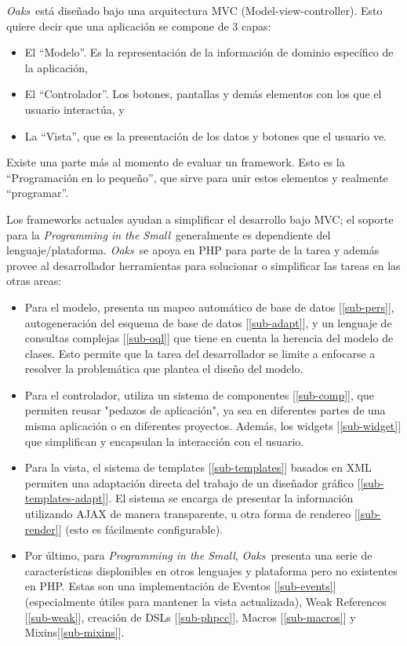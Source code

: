 \documentclass[a4paper,10pt]{article}
\newcommand{\PITS}{\emph{Programming in the Small}} %
\newcommand{\PWB}{\emph{Oaks}}
\begin{document}
\PWB \ está diseñado bajo una arquitectura MVC (Model-view-controller).
Esto quiere decir que una aplicación se compone de 3 capas:
\begin{itemize}
\item El ``Modelo''. Es la representación de la información de dominio específico de la aplicación,
\item El ``Controlador''. Los botones, pantallas y demás elementos con los que el usuario interactúa, y
\item La ``Vista'', que es la presentación de los datos y botones que el usuario ve.
\end{itemize}

Existe una parte más al momento de evaluar un framework. Esto es la ``Programación en lo pequeño'', que sirve para unir estos elementos y realmente ``programar''.

Los frameworks actuales ayudan a simplificar el desarrollo bajo MVC; el soporte para la \PITS \ generalmente es dependiente del lenguaje/plataforma. \PWB \ se apoya en PHP para parte de la tarea y además provee al desarrollador herramientas para solucionar o simplificar las tareas en las otras areas:

\begin{itemize}
\item Para el modelo, presenta un mapeo automático de base de datos [\ref{sub-pers}], autogeneración del esquema de base de datos [\ref{sub-adapt}], y un lenguaje de consultas complejas [\ref{sub-oql}] que tiene en cuenta la herencia del modelo de clases.  Esto permite que la tarea del desarrollador se limite a enfocarse a resolver la problemática que plantea el diseño del modelo.

\item Para el controlador, utiliza un sistema de componentes [\ref{sub-comp}], que permiten reusar "pedazos de aplicación", ya sea en diferentes partes de una misma aplicación o en diferentes proyectos. Además, los widgets [\ref{sub-widget}] que simplifican y encapsulan la interacción con el usuario.

\item Para la vista, el sistema de templates [\ref{sub-templates}] basados en XML permiten una adaptación directa del trabajo de un diseñador gráfico [\ref{sub-templates-adapt}]. El sistema se encarga de presentar la información utilizando AJAX de manera transparente, u otra forma de rendereo [\ref{sub-render}] (esto es fácilmente configurable).

\item Por último, para \PITS, \PWB \ presenta una serie de características displonibles en otros lenguajes y plataforma pero no existentes en PHP. Estas son una implementación de Eventos [\ref{sub-events}] (especialmente útiles para mantener la vista actualizada), Weak References [\ref{sub-weak}], creación de DSLs [\ref{sub-phpcc}], Macros [\ref{sub-macros}] y Mixins[\ref{sub-mixins}].

\end{itemize}
\end{document}
